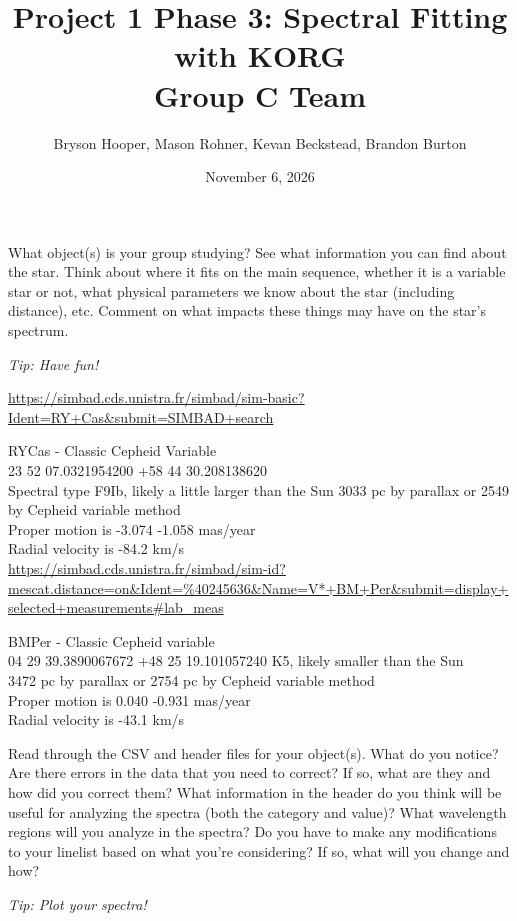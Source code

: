 \documentclass[12pt]{article}
\title{Project 1 Phase 3: Spectral Fitting with KORG \\ \Large Group C Team
}
\author{Bryson Hooper, Mason Rohner, Kevan Beckstead, Brandon Burton}
\date{November 6, 2026}
\newenvironment{question}[1]
  {\par\noindent\textbf{#1}\par\vspace{0.5em}}
  {\vspace{1em}}
\newenvironment{answer}
  {\par\noindent\par\vspace{0.5em}\noindent\ignorespaces}
  {\vspace{1em}}
\begin{document}
\maketitle

\begin{question}{}
    What object(s) is your group studying? See what information you can find about the star. Think about where it fits on the main sequence, whether it is a variable star or not, what physical parameters we know about the star (including distance), etc. Comment on what impacts these things may have on the star's spectrum.

    \textit{Tip: Have fun!}
\end{question}

\begin{answer}
   \url{ https://simbad.cds.unistra.fr/simbad/sim-basic?Ident=RY+Cas&submit=SIMBAD+search}


RYCas - Classic Cepheid Variable \\
23 52 07.0321954200 +58 44 30.208138620 \\
Spectral type F9Ib, likely a little larger than the Sun
3033 pc by parallax or 2549 by Cepheid variable method \\
Proper motion is -3.074 -1.058 mas/year \\
Radial velocity is -84.2 km/s \\




\url{https://simbad.cds.unistra.fr/simbad/sim-id?mescat.distance=on&Ident=%40245636&Name=V*+BM+Per&submit=display+selected+measurements#lab_meas}





BMPer - Classic Cepheid variable \\
04 29 39.3890067672 +48 25 19.101057240 
K5, likely smaller than the Sun \\
3472 pc by parallax or 2754 pc by Cepheid variable method \\
Proper motion is 0.040 -0.931 mas/year \\
Radial velocity is -43.1 km/s \\
\end{answer}

\vspace{10em}

\begin{question}{}
    Read through the CSV and header files for your object(s). What do you notice? Are there errors in the data that you need to correct? If so, what are they and how did you correct them? What information in the header do you think will be useful for analyzing the spectra (both the category and value)? What wavelength regions will you analyze in the spectra? Do you have to make any modifications to your linelist based on what you're considering? If so, what will you change and how?

    \textit{Tip: Plot your spectra!}
\end{question}
\end{document}
